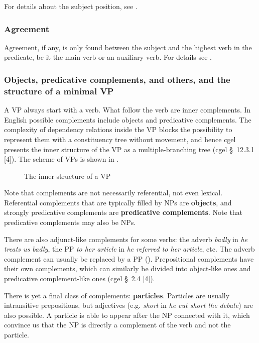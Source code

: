 \documentclass{article}
\newcommand*{\citesec}[1]{\S~{#1}}
\newcommand*{\concept}[1]{\textbf{#1}}
\newcommand*{\corpus}[1]{\emph{#1}}
\begin{document}
For details about the subject position, see .

\subsubsection{Agreement}\label{sec:agreement}

Agreement, if any, is only found between the subject and the highest verb in the predicate,
be it the main verb or an auxiliary verb. 
For details see .

\subsubsection{Objects, predicative complements, and others, and the structure of a minimal VP}\label{sec:complementation-type}

A VP always start with a verb. What follow the verb are inner complements.
In English possible complements include objects and predicative complements.
The complexity of dependency relations inside the VP blocks the possibility 
to represent them with a constituency tree without movement,
and hence \ac{cgel} presents the inner structure of the VP 
as a multiple-branching tree (\ac{cgel} \citesec{12.3.1} [4]).
The scheme of VPs is shown in .

\begin{figure}
    \centering
    
    \caption{The inner structure of a VP}
    \label{fig:verb-phrase}
\end{figure}

Note that complements are not necessarily referential, not even lexical.
Referential complements that are typically filled by NPs are \concept{objects},
and strongly predicative complements are \concept{predicative complements}.
Note that predicative complements may also be NPs.

There are also adjunct-like complements for some verbs:
the adverb \corpus{badly} in \corpus{he treats us badly},
the PP \corpus{to her article} in \corpus{he referred to her article}, etc.
The adverb complement can usually be replaced by a PP ().
Prepositional complements have their own complements, 
which can similarly be divided into object-like ones 
and predicative complement-like ones 
(\ac{cgel} \citesec{2.4} [4]).

There is yet a final class of complements: \concept{particles}.
Particles are usually intransitive prepositions, but adjectives 
(e.g. \corpus{short} in \corpus{he cut short the debate})
are also possible.
A particle is able to appear after the NP connected with it, 
which convince us that the NP is directly a complement of the verb and not the particle.
\end{document}
